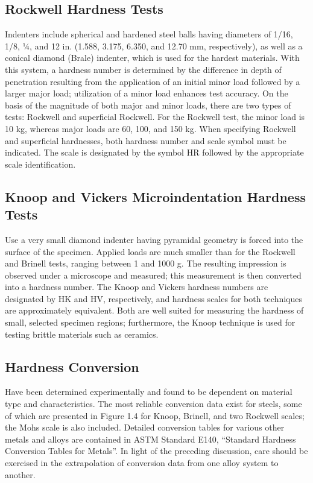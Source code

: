 \subsection{Rockwell Hardness Tests}
Indenters include spherical and hardened steel balls having diameters of 1/16, 1/8, ¼, and 12 in. (1.588, 3.175, 6.350, and 12.70 mm, respectively), as well as a conical diamond (Brale) indenter, which is used for the hardest materials. With this system, a hardness number is determined by the difference in depth of penetration resulting from the application of an initial minor load followed by a larger major load; utilization of a minor load enhances test accuracy. On the basis of the magnitude of both major and minor loads, there are two types of tests: Rockwell and superficial Rockwell. For the Rockwell test, the minor  load is  10  kg, whereas major  loads are 60, 100, and 150 kg. When specifying  Rockwell  and superficial  hardnesses,  both  hardness  number  and  scale  symbol  must  be  indicated.  The  scale  is designated by the symbol HR followed by the appropriate scale identification.
\subsection{Knoop and Vickers Microindentation Hardness Tests}
Use a very small diamond indenter having pyramidal geometry is forced into the surface of the specimen. Applied loads are much smaller than for the Rockwell and Brinell tests, ranging between 1 and 1000 g. The resulting impression is observed under a microscope and measured; this measurement is then converted into a hardness number. The Knoop and Vickers hardness numbers are designated by HK and HV, respectively, and hardness scales for both techniques are approximately equivalent. Both are well suited for measuring the hardness of small, selected specimen regions; furthermore, the Knoop technique is used for testing brittle materials such as ceramics.
\subsection{Hardness Conversion}
Have been determined experimentally and found to be dependent on material type and characteristics. The most reliable conversion data exist for steels, some of which are presented in Figure 1.4 for Knoop, Brinell, and two Rockwell scales; the Mohs scale is also included. Detailed conversion tables for various other metals and alloys are contained in ASTM Standard E140, “Standard Hardness Conversion Tables for  Metals”.  In  light  of  the  preceding  discussion,  care  should  be  exercised  in  the  extrapolation  of conversion data from one alloy system to another.

